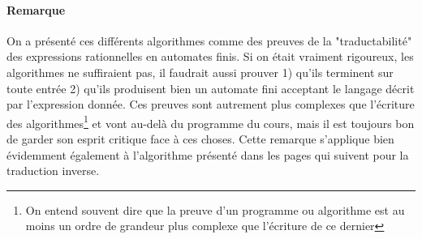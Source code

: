\paragraph*{Remarque} On a présenté ces différents algorithmes comme des preuves de la "traductabilité" des expressions rationnelles en automates finis. Si on était vraiment rigoureux, les algorithmes ne suffiraient pas, il faudrait aussi prouver 1) qu'ils terminent sur toute entrée 2) qu'ils produisent bien un automate fini acceptant le langage décrit par l'expression donnée. Ces preuves sont autrement plus complexes que l'écriture des algorithmes\footnote{On entend souvent dire que la preuve d'un programme ou algorithme est au moins un ordre de grandeur plus complexe que l'écriture de ce dernier} et vont au-delà du programme du cours, mais il est toujours bon de garder son esprit critique face à ces choses. Cette remarque s'applique bien évidemment également à l'algorithme présenté dans les pages qui suivent pour la traduction inverse.
